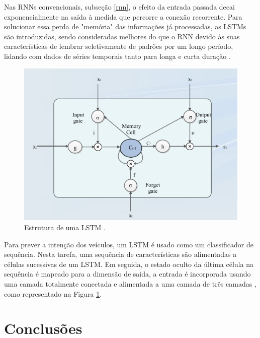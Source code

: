  \label{LSTM-s}

Nas RNNs convencionais, subseção \ref{rnn}, o efeito da entrada passada decai exponencialmente na saída à medida que percorre a conexão recorrente. Para solucionar essa perda de "memória" das informações já processadas, as LSTMs são introduzidas, sendo consideradas melhores do que o RNN devido às suas características de lembrar seletivamente de padrões por um longo período, lidando com dados de séries temporais tanto para longa e curta duração \cite{software-cnn}.

\begin{figure}[H]
\centering
\includegraphics[width=\textwidth]{Figures/LSTM.png}
\caption{Estrutura de uma LSTM \cite{software-cnn}.}
\label{LSTM}
\end{figure}



Para prever a intenção dos veículos, um LSTM é usado como um classificador de sequência. Nesta tarefa, uma sequência de características são alimentadas a células sucessivas de um LSTM. Em seguida, o estado oculto da última célula na sequência é mapeado para a dimensão de saída, a entrada é incorporada usando uma camada totalmente conectada e alimentada a uma camada de três camadas \cite{software-review}, como representado na Figura \ref{LSTM}.




\chapter{Conclusões} \label{concl}


